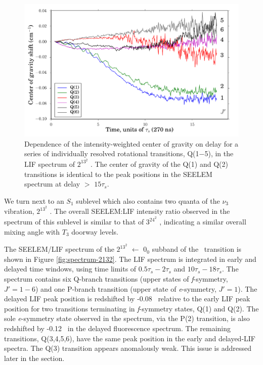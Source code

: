 \documentclass[12pt]{mitthesis}
\begin{document}
\begin{figure}
  \caption{Dependence of the intensity-weighted center of gravity on
    delay for a series of individually resolved rotational
    transitions, Q(1$-$5), in the LIF spectrum of $2^13^2$ .
    The center of gravity of the Q(1) and Q(2) transitions is
    identical to the peak positions in the SEELEM spectrum at
    delay $>$ $15\tau_s$.}
  \label{fig:2132-q123456-cog-delay}
  \centering
  \vspace{1cm}
  \includegraphics[width=6in]{2132-q123456-cog-delay.pdf}
\end{figure}


We turn next to an $S_1$ sublevel which also contains two quanta of
the $\nu_3$ vibration, $2^13^2$ .  The overall SEELEM:LIF
intensity ratio observed in the spectrum of this sublevel is similar
to that of $3^24^2$ , indicating a similar overall mixing angle
with $T_3$ doorway levels.

The SEELEM/LIF spectrum of the $2^13^2$  $\leftarrow$ $0_0$
subband of the \AtoX\ transition is shown in Figure
\ref{fig:spectrum-2132}.  The LIF spectrum is integrated in early and
delayed time windows, using time limits of $0.5\tau_s-2\tau_s$ and
$10\tau_s-18\tau_s$.  The spectrum contains six Q-branch transitions
(upper states of \emph{f}-symmetry, $J'=1-6$) and one P-branch
transition (upper state of \emph{e}-symmetry, $J'=1$).  The delayed
LIF peak position is redshifted by -0.08 \rcm\ relative to the early
LIF peak position for two transitions terminating in \emph{f}-symmetry
states, Q(1) and Q(2).  The sole \emph{e}-symmetry state observed in
the spectrum, via the P(2) transition, is also redshifted by -0.12
\rcm\ in the delayed fluorescence spectrum.  The remaining
transitions, Q(3,4,5,6), have the same peak position in the early and
delayed-LIF spectra.  The Q(3) transition appears anomalously weak.
This issue is addressed later in the section.
\end{document}
